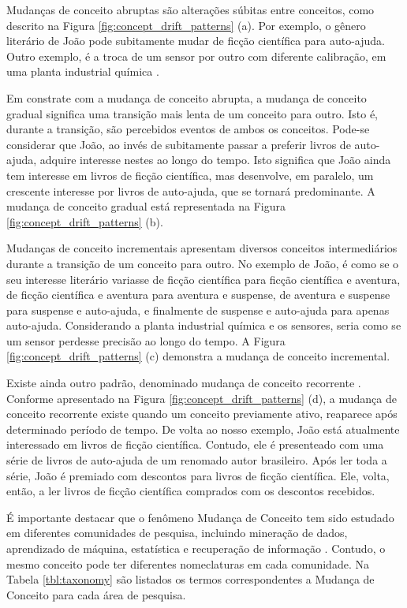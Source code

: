 \documentclass[qual, classic, a4paper]{ufbathesis}
\begin{document}
Mudanças de conceito abruptas são alterações súbitas entre conceitos, como descrito na Figura \ref{fig:concept_drift_patterns} (a).
Por exemplo, o gênero literário de João pode subitamente mudar de ficção científica para auto-ajuda.
Outro exemplo, é a troca de um sensor por outro com diferente calibração, em uma planta industrial química \cite{Gama:2014:SCD:2597757.2523813}. 

Em constrate com a mudança de conceito abrupta, a mudança de conceito gradual significa uma transição mais lenta de um conceito para outro.
Isto é, durante a transição, são percebidos eventos de ambos os conceitos.
Pode-se considerar que João, ao invés de subitamente passar a preferir livros de auto-ajuda, adquire interesse nestes ao longo do tempo.
Isto significa que João ainda tem interesse em livros de ficção científica, mas desenvolve, em paralelo, um crescente interesse por livros de auto-ajuda, que se tornará predominante.
A mudança de conceito gradual está representada na Figura \ref{fig:concept_drift_patterns} (b).

Mudanças de conceito incrementais apresentam diversos conceitos intermediários durante a transição de um conceito para outro.
No exemplo de João, é como se o seu interesse literário variasse de ficção científica para ficção científica e aventura, 
de ficção científica e aventura para aventura e suspense, de aventura e suspense para suspense e auto-ajuda, e finalmente de suspense e auto-ajuda para apenas auto-ajuda.
Considerando a planta industrial química e os sensores, seria como se um sensor perdesse precisão ao longo do tempo. 
A Figura \ref{fig:concept_drift_patterns} (c) demonstra a mudança de conceito incremental. 

Existe ainda outro padrão, denominado mudança de conceito recorrente \cite{Zliobaite:2010}. 
Conforme apresentado na Figura \ref{fig:concept_drift_patterns} (d), a mudança de conceito recorrente existe quando um conceito previamente ativo, 
reaparece após determinado período de tempo.
De volta ao nosso exemplo, João está atualmente interessado em livros de ficção científica.
Contudo, ele é presenteado com uma série de livros de auto-ajuda de um renomado autor brasileiro.
Após ler toda a série, João é premiado com descontos para livros de ficção científica.
Ele, volta, então, a ler livros de ficção científica comprados com os descontos recebidos.

É importante destacar que o fenômeno Mudança de Conceito tem sido estudado em diferentes comunidades de pesquisa, incluindo mineração de dados, 
aprendizado de máquina, estatística e recuperação de informação \cite{Zliobaite:2010}.
Contudo, o mesmo conceito pode ter diferentes nomeclaturas em cada comunidade.
Na Tabela \ref{tbl:taxonomy} são listados os termos correspondentes a Mudança de Conceito para cada área de pesquisa.
\end{document}
